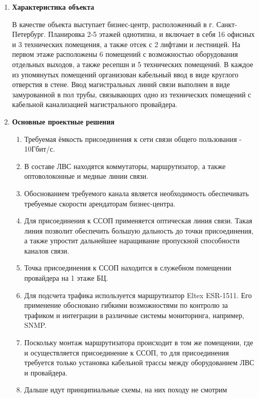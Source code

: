 \documentclass[a4paper,14pt]{extarticle}
\begin{document}
\begin{enumerate}
\begin{enumerate}
        \end{enumerate}
        \item \textbf{Характеристика объекта}\par
        В качестве объекта выступает бизнес-центр, расположенный в г. Санкт-Петербург. Планировка 2-5 этажей однотипна, и 
        включает в себя 16 офисных и 3 технических помещения, а также отсек с 2 лифтами и лестницей. На первом этаже расположены 
        6 помещений с возможностью оборудования отдельных выходов, а также ресепшн и 5 технических помещений. В каждое из упомянутых 
        помещений организован кабельный ввод в виде круглого отверстия в стене. Ввод магистральных линий связи выполнен в виде 
        замурованной в пол трубы, связывающих одно из технических помещений с кабельной канализацией магистрального провайдера. 
        \item \textbf{Основные проектные решения}\par
        \begin{enumerate}
            \item Требуемая ёмкость присоединения к сети связи общего пользования - 10Гбит/с.
            \item В составе ЛВС находятся коммутаторы, маршрутизатор, а также оптоволоконные и медные линии связи.
            \item Обоснованием требуемого канала является необходимость обеспечивать требуемые скорости арендаторам бизнес-центра.
            \item Для присоединения к ССОП применяется оптическая линия связи. Такая линия позволит обеспечить большую дальность 
            до точки присоединения, а также упростит дальнейшее наращивание пропускной способности каналов связи.
            \item Точка присоединения к ССОП находится в служебном помещении провайдера на 1 этаже БЦ.
            \item Для подсчета трафика используется маршрутизатор Eltex ESR-1511. Его применение обосновано гибкими возможностями 
            по контролю за трафиком и интеграции в различные системы мониторинга, например, SNMP.
            \item Поскольку монтаж маршрутизатора происходит в том же помещении, где и осуществляется присоединение к ССОП, то для 
            присоединения требуется только установка кабельной трассы между оборудованием ЛВС и провайдера.
            \item Дальше идут принципиальные схемы, на них походу не смотрим
        \end{enumerate}

\end{enumerate}
\end{document}
